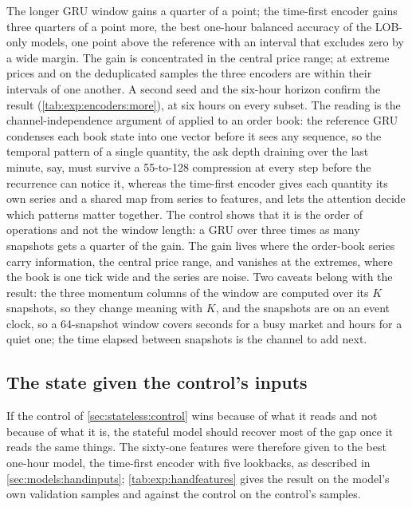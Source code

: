 The longer GRU window gains a quarter of a point; the time-first encoder gains three
quarters of a point more, the best one-hour balanced accuracy of the LOB-only models, one
point above the reference with an interval that excludes zero by a wide margin.  The gain is
concentrated in the central price range; at extreme prices and on the deduplicated samples
the three encoders are within their intervals of one another.  A second seed and the
six-hour horizon confirm the result (\cref{tab:exp:encoders:more}), at six hours on every
subset.  The reading is the channel-independence argument of \textcite{nie2023patchtst}
applied to an order book: the reference GRU condenses each book state into one vector
before it sees any sequence, so the temporal pattern of a single quantity, the ask depth
draining over the last minute, say, must survive a 55-to-128 compression at every step
before the recurrence can notice it, whereas the time-first encoder gives each quantity its
own series and a shared map from series to features, and lets the attention decide which
patterns matter together.  The control shows that it is the order of operations and not
the window length: a GRU over three times as many snapshots gets a quarter of the gain.  The
gain lives where the order-book series carry information, the central price range, and
vanishes at the extremes, where the book is one tick wide and the series are noise.  Two
caveats belong with the result: the three momentum columns of the window are computed over
its $K$ snapshots, so they change meaning with $K$, and the snapshots are on an event
clock, so a 64-snapshot window covers seconds for a busy market and hours for a quiet one;
the time elapsed between snapshots is the channel to add next.

\subsection{The state given the control's inputs}
\label{sec:stateful:hand}
\label{sec:exp:handfeatures}

If the control of \cref{sec:stateless:control} wins because of what it reads and not
because of what it is, the stateful model should recover most of the gap once it reads the
same things.  The sixty-one features were therefore given to the best one-hour model, the
time-first encoder with five lookbacks, as described in \cref{sec:models:handinputs};
\cref{tab:exp:handfeatures} gives the result on the model's own validation samples and
against the control on the control's samples.

